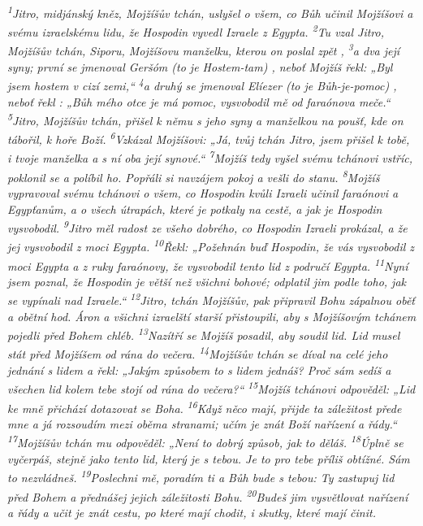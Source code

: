\documentclass[11pt]{article}
\begin{document}
\textit{
\textsuperscript{1}Jitro, midjánský kněz, Mojžíšův tchán, uslyšel o všem, co Bůh učinil Mojžíšovi a svému izraelskému lidu, že Hospodin vyvedl Izraele z Egypta.
\textsuperscript{2}Tu vzal Jitro, Mojžíšův tchán, Siporu, Mojžíšovu manželku, kterou on poslal zpět ,
\textsuperscript{3}a dva její syny; první se jmenoval Geršóm (to je Hostem-tam) , neboť Mojžíš řekl: „Byl jsem hostem v cizí zemi,“
\textsuperscript{4}a druhý se jmenoval Elíezer (to je Bůh-je-pomoc) , neboť řekl : „Bůh mého otce je má pomoc, vysvobodil mě od faraónova meče.“
\textsuperscript{5}Jitro, Mojžíšův tchán, přišel k němu s jeho syny a manželkou na poušť, kde on tábořil, k hoře Boží.
\textsuperscript{6}Vzkázal Mojžíšovi: „Já, tvůj tchán Jitro, jsem přišel k tobě, i tvoje manželka a s ní oba její synové.“
\textsuperscript{7}Mojžíš tedy vyšel svému tchánovi vstříc, poklonil se a políbil ho. Popřáli si navzájem pokoj a vešli do stanu.
\textsuperscript{8}Mojžíš vypravoval svému tchánovi o všem, co Hospodin kvůli Izraeli učinil faraónovi a Egypťanům, a o všech útrapách, které je potkaly na cestě, a jak je Hospodin vysvobodil.
\textsuperscript{9}Jitro měl radost ze všeho dobrého, co Hospodin Izraeli prokázal, a že jej vysvobodil z moci Egypta.
\textsuperscript{10}Řekl: „Požehnán buď Hospodin, že vás vysvobodil z moci Egypta a z ruky faraónovy, že vysvobodil tento lid z područí Egypta.
\textsuperscript{11}Nyní jsem poznal, že Hospodin je větší než všichni bohové; odplatil jim podle toho, jak se vypínali nad Izraele.“
\textsuperscript{12}Jitro, tchán Mojžíšův, pak připravil Bohu zápalnou oběť a obětní hod. Áron a všichni izraelští starší přistoupili, aby s Mojžíšovým tchánem pojedli před Bohem chléb.
\textsuperscript{13}Nazítří se Mojžíš posadil, aby soudil lid. Lid musel stát před Mojžíšem od rána do večera.
\textsuperscript{14}Mojžíšův tchán se díval na celé jeho jednání s lidem a řekl: „Jakým způsobem to s lidem jednáš? Proč sám sedíš a všechen lid kolem tebe stojí od rána do večera?“
\textsuperscript{15}Mojžíš tchánovi odpověděl: „Lid ke mně přichází dotazovat se Boha.
\textsuperscript{16}Když něco mají, přijde ta záležitost přede mne a já rozsoudím mezi oběma stranami; učím je znát Boží nařízení a řády.“
\textsuperscript{17}Mojžíšův tchán mu odpověděl: „Není to dobrý způsob, jak to děláš.
\textsuperscript{18}Úplně se vyčerpáš, stejně jako tento lid, který je s tebou. Je to pro tebe příliš obtížné. Sám to nezvládneš.
\textsuperscript{19}Poslechni mě, poradím ti a Bůh bude s tebou: Ty zastupuj lid před Bohem a přednášej jejich záležitosti Bohu.
\textsuperscript{20}Budeš jim vysvětlovat nařízení a řády a učit je znát cestu, po které mají chodit, i skutky, které mají činit.
}
\end{document}
